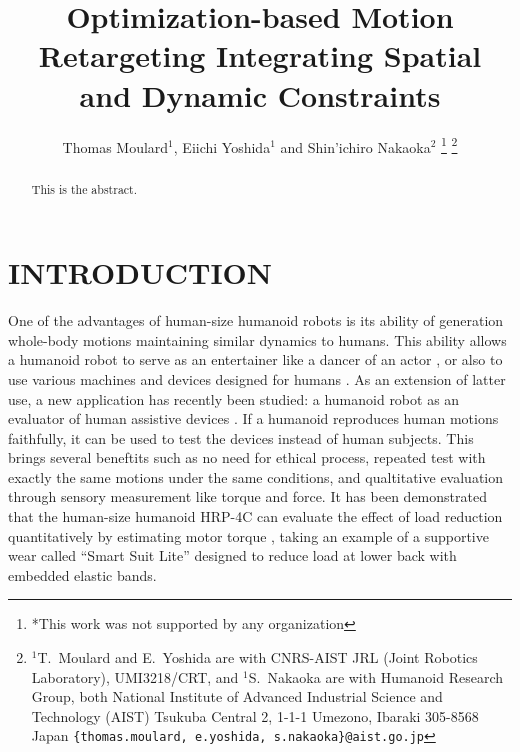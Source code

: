 \documentclass[letterpaper, 10 pt, conference]{ieeeconf}  %
\title{\LARGE \bf
Optimization-based Motion Retargeting Integrating Spatial and Dynamic Constraints
}
\author{Thomas Moulard$^{1}$, Eiichi Yoshida$^{1}$ and Shin'ichiro
  Nakaoka$^{2}$%
\thanks{*This work was not supported by any organization}%
\thanks{$^{1}$T.~Moulard and E.~Yoshida are with CNRS-AIST JRL (Joint
  Robotics Laboratory), UMI3218/CRT, and $^{1}$S.~Nakaoka are with
  Humanoid Research Group, both National Institute of Advanced Industrial Science and Technology (AIST)
Tsukuba Central 2, 1-1-1 Umezono, Ibaraki 305-8568 Japan
        {\tt\footnotesize \{thomas.moulard, e.yoshida, s.nakaoka\}@aist.go.jp}}%
}
\begin{document}
\maketitle
\thispagestyle{empty}
\pagestyle{empty}


\begin{abstract}
This is the abstract.

\end{abstract}


\section{INTRODUCTION}
\label{sec:intro}

One of the advantages of human-size humanoid robots is
its ability of generation whole-body motions maintaining similar
dynamics to humans. 
This ability allows a humanoid robot to serve as an entertainer like
a dancer of an actor \cite{nakaoka_iros2010}, or also to use various
machines and devices designed for humans \cite{Yokoi03iros}.
As an extension of latter use, a new application
has recently been studied: a humanoid robot as an evaluator of human
assistive devices \cite{Takanishi06ICRA,Miura13ICRA}.
If a humanoid reproduces human motions faithfully, it can be used to
test the devices instead of human subjects. 
This brings several beneftits such as no need for ethical 
process, repeated test with exactly the same motions under the same
conditions, and qualtitative evaluation through sensory measurement
like torque and force.
It has been demonstrated that the human-size humanoid HRP-4C
\cite{Kaneko09Humanoids}  can evaluate the effect of load reduction
quantitatively by estimating motor torque \cite{Miura13ICRA}, taking
an example of a supportive wear called ``Smart Suit Lite''
\cite{Tanaka11JRM} designed to reduce load 
at lower back with embedded elastic bands. 
\end{document}
